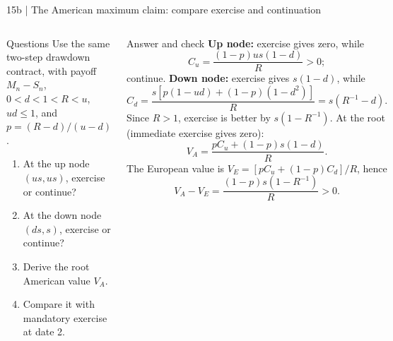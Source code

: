 \documentclass[handout,10pt,t,aspectratio=169]{beamer}
\newenvironment{questions}{\begin{block}{Questions}}{\end{block}}
\newenvironment{answers}{\begin{exampleblock}{Answer and check}}{\end{exampleblock}}
\newcommand{\compact}{\small%
 \setlength{\abovedisplayskip}{3pt}%
 \setlength{\belowdisplayskip}{3pt}%
 \setlength{\abovedisplayshortskip}{2pt}%
 \setlength{\belowdisplayshortskip}{2pt}%
 \setlength{\parskip}{2pt}}
\begin{document}
\begin{frame}{15b | The American maximum claim: compare exercise and continuation}
\compact
\setlength{\abovedisplayskip}{2pt}\setlength{\belowdisplayskip}{2pt}
\setlength{\abovedisplayshortskip}{1pt}\setlength{\belowdisplayshortskip}{1pt}
\begin{columns}[T,onlytextwidth]
\begin{questions}
Use the same two-step drawdown contract, with payoff \(M_n-S_n\),
\(0<d<1<R<u\), \(ud\leq1\), and
\(p=(R-d)/(u-d)\).
\begin{enumerate}
\item At the up node \((us,us)\), exercise or continue?
\item At the down node \((ds,s)\), exercise or continue?
\item Derive the root American value \(V_A\).
\item Compare it with mandatory exercise at date 2.
\end{enumerate}
\end{questions}
\begin{answers}
\textbf{Up node:} exercise gives zero, while
\[
 C_u=\frac{(1-p)us(1-d)}R>0;
\]
continue. \textbf{Down node:} exercise gives \(s(1-d)\), while
\[
 C_d=\frac{s[p(1-ud)+(1-p)(1-d^2)]}R
     =s(R^{-1}-d).
\]
Since \(R>1\), exercise is better by \(s(1-R^{-1})\).
At the root (immediate exercise gives zero):
\[
 \boxed{V_A=\frac{pC_u+(1-p)s(1-d)}R.}
\]
The European value is \(V_E=[pC_u+(1-p)C_d]/R\), hence
\[
 \boxed{V_A-V_E=\frac{(1-p)s(1-R^{-1})}R>0.}
\]
\end{answers}
\end{columns}
\end{frame}
\end{document}
